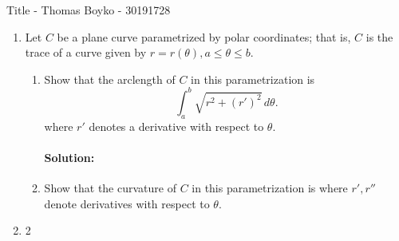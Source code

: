 \documentclass{article}
\begin{document}
    \huge Title - Thomas Boyko - 30191728
    \normalsize
\begin{enumerate} 

    \item Let $C$ be a plane curve parametrized by polar coordinates; that is, $C$ is
the trace of a curve given by $r = r(\theta), a \leq\theta\leq b.$
\begin{enumerate}
    \item Show that the arclength of $C$ in this parametrization is
        \[
        \int_{a}^{b} \sqrt{r^2+(r')^2}  \, d \theta 
        .\] 
where $r'$ denotes a derivative with respect to $\theta$.

\paragraph{Solution: } 
\item Show that the curvature of $C$ in this parametrization is
where $r', r''$ denote derivatives with respect to $\theta$.


\end{enumerate}
\item  2

\end{enumerate}
\end{document}
